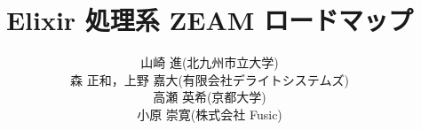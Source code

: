 \documentclass[9pt, uplatex]{jsarticle}
\begin{document}
\title{Elixir 処理系 ZEAM ロードマップ}

\author{山崎 進(北九州市立大学)\\森 正和，上野 嘉大(有限会社デライトシステムズ)\\高瀬 英希(京都大学)\\小原 崇寛(株式会社 Fusic)}

\date{}

\maketitle






\end{document}
